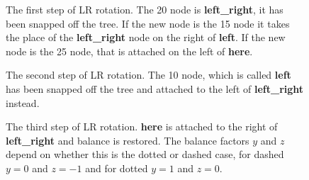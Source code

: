 \documentclass[11pt,a4paper]{scrartcl}
\begin{document}
\begin{figure}
\begin{center}
\end{center}
\caption{The first step of LR rotation. The 20 node is \textbf{
    left\_right}, it has been snapped off the tree. If the new node is
  the 15 node it takes the place of the \textbf{left\_right} node on the
  right of \textbf{left}.  If the new node is the 25 node, that is
  attached on the left of \textbf{here}.\label{fig_LR_1}}
\end{figure}


\begin{figure}
\begin{center}
\end{center}
\caption{The second step of LR rotation. The 10 node, which is called \textbf{left} has been snapped off the tree and attached to the left of \textbf{left\_right} instead. \label{fig_LR_2}}
\end{figure}


\begin{figure}
\begin{center}
\end{center}
\caption{The third step of LR rotation. \textbf{here} is attached to the
  right of \textbf{left\_right} and balance is restored. The balance
  factors $y$ and $z$ depend on whether this is the dotted or dashed
  case, for dashed $y=0$ and $z=-1$ and for dotted $y=1$ and
  $z=0$.\label{fig_LR_3}}
\end{figure}
\end{document}
